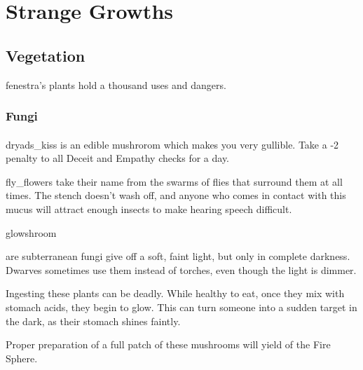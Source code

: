 \chapter{Strange Growths}
\label{growths}

\section[Vegetation]{Vegetation~}

\begin{multicols}{2}
\renewcommand\npcsymbol{\glsentrysymbol{plant}}

\noindent
\Gls{fenestra}'s plants hold a thousand uses and dangers.

\subsection{Fungi}

\subsubsection{}

%
  {dryads_kiss}%
  {is an edible mushrorom which makes you very gullible.
  Take a -2 penalty to all Deceit and Empathy checks for a day.}%

%
  {fly_flowers}%
  {take their name from the swarms of flies that surround them at all times.
  The stench doesn't wash off, and anyone who comes in contact with this mucus will attract enough insects to make hearing speech difficult.}%

%
  {glowshroom}%
  {are subterranean fungi give off a soft, faint light, but only in complete darkness.
   Dwarves sometimes use them instead of torches, even though the light is dimmer.

   Ingesting these plants can be deadly.
   While healthy to eat, once they mix with stomach acids, they begin to glow.
   This can turn someone into a sudden target in the dark, as their stomach shines faintly.

   Proper preparation of a full patch of these mushrooms will yield  of the Fire Sphere.
    }

\subsubsection{}


\end{multicols}
